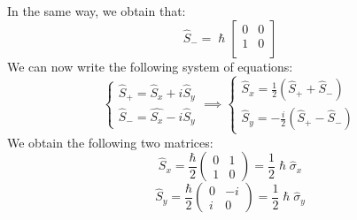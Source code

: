 \documentclass{article}
\begin{document}
In the same way, we obtain that:
$$ \hat{S}_- = \hslash \begin{bmatrix} 0 & 0 \\ 1 & 0 \\
\end{bmatrix}$$
We can now write the following system of equations: \\ 
$$
\begin{cases}
\hat{S}_+ = \hat{S}_x + i \hat{S}_y \\ 
\hat{S}_- = \hat{S_x} - i \hat{S}_y  
\end{cases} \implies \begin{cases}
\hat{S}_x = \frac{1}{2} (\hat{S}_+ + \hat{S}_-) \\ 
\hat{S}_y = -\frac{i}{2}(\hat{S}_+- \hat{S}_-) 
\end{cases} $$
We obtain the following two matrices:
$$\hat{S}_x = \frac{\hbar}{2} \begin{pmatrix} 0 & 1 \\ 1 & 0 \end{pmatrix} = \frac{1}{2} \hslash \hat{\sigma}_x$$
$$ \hat{S}_y = \frac{\hbar}{2} \begin{pmatrix} 0 & -i \\ i & 0 \end{pmatrix} =  \frac{1}{2} \hslash \hat{\sigma}_y$$
\end{document}
